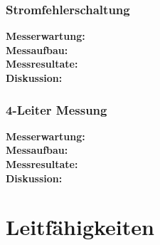 \subsubsection{Stromfehlerschaltung}
\textbf{Messerwartung:}
\\
\textbf{Messaufbau:}
\\
\textbf{Messresultate:}
\\
\textbf{Diskussion:}
\subsubsection{4-Leiter Messung}
\textbf{Messerwartung:}
\\
\textbf{Messaufbau:}
\\
\textbf{Messresultate:}
\\
\textbf{Diskussion:}
\section{Leitfähigkeiten}

